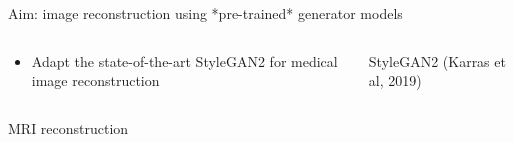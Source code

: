\begin{frame}{Aim: image reconstruction using *pre-trained* generator models}

\begin{columns}
 \begin{column}{0.5\textwidth}
  
  \begin{itemize}
   \item Adapt the state-of-the-art StyleGAN2 for medical image reconstruction

   
  \end{itemize}
  
 \vspace{1em}
 
% 
  \begin{column}{\textwidth}
  \centering
  MRI reconstruction\\
  \mrirecon
  
  \end{column}
  
 \end{column} 
 
 \begin{column}{0.5\textwidth}
 \centering
 StyleGAN2 (Karras et al, 2019)
 \end{column}

\end{columns}



\end{frame}


